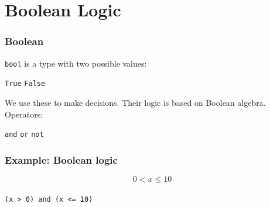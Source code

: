 \documentclass[11pt]{beamer}
\begin{document}
\section{Boolean Logic}

\begin{frame}[fragile]
  \frametitle{Boolean}
  \Enlarge

  \begin{itemize}
  \myitem  \texttt{bool} is a type with two possible values:
    \begin{itemize}
    \mysubitem  \texttt{True}
    \mysubitem  \texttt{False}
    \end{itemize}
  \myitem  We use these to make decisions.
  \myitem  Their logic is based on Boolean algebra.
  \myitem  Operators:
    \begin{itemize}
    \mysubitem  \texttt{and}
    \mysubitem  \texttt{or}
    \mysubitem  \texttt{not}
    \end{itemize}
  \end{itemize}
\end{frame}

\begin{frame}[fragile]
  \frametitle{Example:  Boolean logic}
  \Enlarge

  \begin{center}
  $$
  0 < x \leq 10
  $$
  \\
  \texttt{(x > 0) and (x <= 10)}
  \end{center}
\end{frame}
\end{document}
